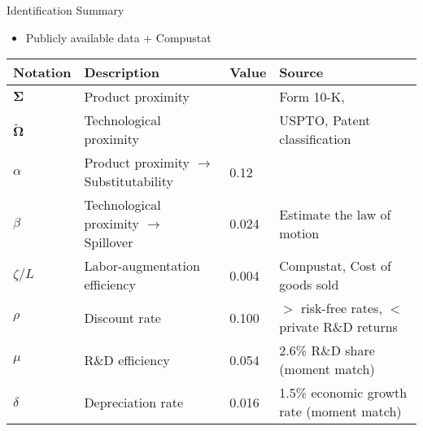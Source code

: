 \documentclass[
  10pt,               %
  aspectratio=169,     %
]{beamer}
\theoremstyle{plain}
\begin{document}
\begin{frame}{Identification Summary}
  \begin{itemize}
    \item Publicly available data + Compustat
  \end{itemize}
  \begin{table}[h]
    \centering
    \small
    \begin{tabular}{llll}
      \toprule
      Notation                  & Description                                      & Value   & Source                                        \\
      \midrule
      $\bm{\Sigma}$             & Product proximity                                &         & Form 10-K, \citet{Hoberg2016-jm}              \\
      $\bm{\widetilde{\Omega}}$ & Technological proximity                          &         & USPTO, Patent classification                  \\
      $\alpha$                  & Product proximity $\rightarrow$ Substitutability & 0.12    & \citet{Pellegrino2024-dn}                     \\
      $\beta$                   & Technological proximity $\rightarrow$ Spillover  & 0.024 & Estimate the law of motion                    \\
      $\zeta/L$                 & Labor-augmentation efficiency                    & 0.004 & Compustat, Cost of goods sold                 \\
      $\rho$                    & Discount rate                                    & 0.100    & $>$ risk-free rates, $<$ private R\&D returns \\
      $\mu$                     & R\&D efficiency                                  & 0.054 & 2.6\% R\&D share (moment match)               \\
      $\delta$                  & Depreciation rate                                & 0.016 & 1.5\% economic growth rate (moment match)     \\
      \bottomrule
    \end{tabular}
  \end{table}
\end{frame}
\end{document}
